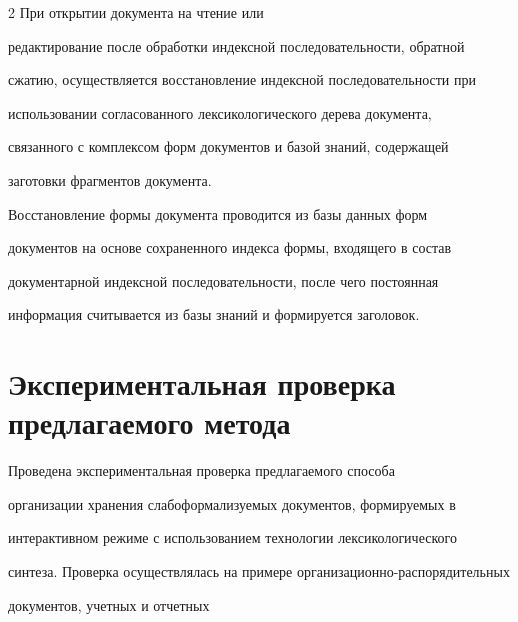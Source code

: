 \begin{multicols}{2}
При открытии документа на чтение или 


редактирование после обработки индексной последовательности, обратной 


сжатию, осуществляется восстановление индексной последовательности при\linebreak 


использовании согласованного лексикологического дерева документа, 


связанного с комплексом форм документов и базой знаний, содержащей 


заготовки фрагментов документа.


     


     Восстановление формы документа проводится из базы данных форм 


документов на основе сохраненного индекса формы, входящего в состав 


документарной индексной последовательности, после чего постоянная 


информация считывается из базы знаний и формируется заголовок.





\section{Экспериментальная проверка предлагаемого метода}





     Проведена экспериментальная проверка предлагаемого способа 


организации хранения сла\-бо\-фор\-ма\-ли\-зу\-емых документов, формируемых в 


интерактивном режиме с использованием технологии лексикологического 


синтеза. Проверка осуществлялась на примере организационно-распорядительных 


документов, учетных и отчетных\linebreak\vspace*{-12pt}


\pagebreak





\end{multicols}





